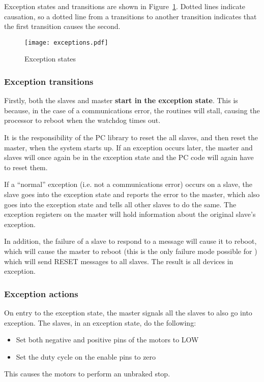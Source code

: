 Exception states and transitions are shown in Figure~\ref{exceptionfig}. Dotted
lines indicate causation, so a dotted line from a transitions to another
transition indicates that the first transition causes the second.
\begin{figure}[ht]
\center
\texttt{[image: exceptions.pdf]}
\caption{Exception states}
\label{exceptionfig}
\end{figure}


\subsubsection{Exception transitions}
Firstly, both the slaves and master \textbf{start in the exception state}. This
is because, in the case of a communications error, the \isqc{} routines
will stall, causing the processor to reboot when the watchdog times out.

It is the responsibility of the PC library to reset the all slaves, and then
reset the master, when the system starts up. If an exception occurs
later, the master and slaves will once again be in the exception state
and the PC code will again have to reset them.

If a ``normal'' exception (i.e. not a communications error) occurs
on a slave, the slave goes into the exception state and reports the error
to the master, which also goes into the exception state and tells all other
slaves to do the same. The exception registers on the master will hold
information about the original slave's exception.

In addition, the failure
of a slave to respond to a message will cause it to reboot, which will
cause the master to reboot (this is the only failure mode possible for \isqc{}) which will send 
RESET messages to all slaves. The result is all devices in exception.

\subsubsection{Exception actions}
On entry to the exception state, the master signals all the slaves to
also go into exception. The slaves, in an exception state, do the following:
\begin{itemize}
\item Set both negative and positive pins of the motors to LOW
\item Set the duty cycle on the enable pins to zero
\end{itemize}
This causes the motors to perform an unbraked stop.

